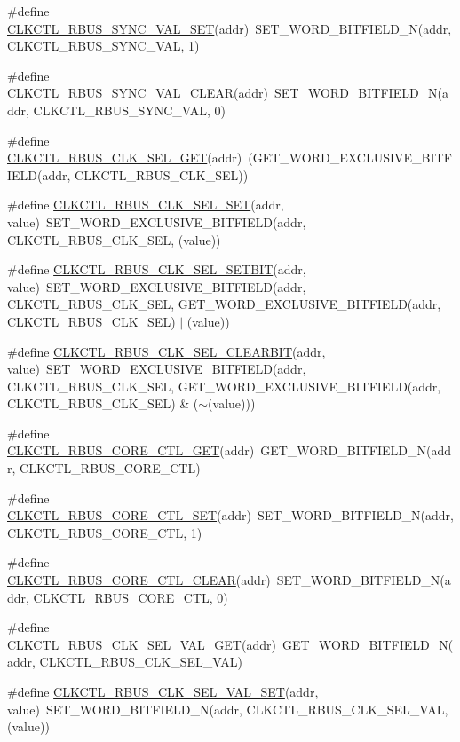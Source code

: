 \begin{DoxyCompactItemize}
\item 
\#define \hyperlink{a00544_a17efc520c0546b9386b4db06a1058df6}{CLKCTL\_\-RBUS\_\-SYNC\_\-VAL\_\-SET}(addr)~SET\_\-WORD\_\-BITFIELD\_\-N(addr, CLKCTL\_\-RBUS\_\-SYNC\_\-VAL, 1)
\item 
\#define \hyperlink{a00544_a7f05733a1dfb6b3bbe63cd0a077f350e}{CLKCTL\_\-RBUS\_\-SYNC\_\-VAL\_\-CLEAR}(addr)~SET\_\-WORD\_\-BITFIELD\_\-N(addr, CLKCTL\_\-RBUS\_\-SYNC\_\-VAL, 0)
\item 
\#define \hyperlink{a00544_a974dfbf293d8e8d42fe3201eb2436dcb}{CLKCTL\_\-RBUS\_\-CLK\_\-SEL\_\-GET}(addr)~(GET\_\-WORD\_\-EXCLUSIVE\_\-BITFIELD(addr, CLKCTL\_\-RBUS\_\-CLK\_\-SEL))
\item 
\#define \hyperlink{a00544_a8057bbf7c24e1f18e0985072b8407062}{CLKCTL\_\-RBUS\_\-CLK\_\-SEL\_\-SET}(addr, value)~SET\_\-WORD\_\-EXCLUSIVE\_\-BITFIELD(addr, CLKCTL\_\-RBUS\_\-CLK\_\-SEL, (value))
\item 
\#define \hyperlink{a00544_ad42d3759b0f858a3a7c19691ba63cb42}{CLKCTL\_\-RBUS\_\-CLK\_\-SEL\_\-SETBIT}(addr, value)~SET\_\-WORD\_\-EXCLUSIVE\_\-BITFIELD(addr, CLKCTL\_\-RBUS\_\-CLK\_\-SEL, GET\_\-WORD\_\-EXCLUSIVE\_\-BITFIELD(addr, CLKCTL\_\-RBUS\_\-CLK\_\-SEL) $|$ (value))
\item 
\#define \hyperlink{a00544_a1af6c5aaa7b540608b51a6ddfc6cdc49}{CLKCTL\_\-RBUS\_\-CLK\_\-SEL\_\-CLEARBIT}(addr, value)~SET\_\-WORD\_\-EXCLUSIVE\_\-BITFIELD(addr, CLKCTL\_\-RBUS\_\-CLK\_\-SEL, GET\_\-WORD\_\-EXCLUSIVE\_\-BITFIELD(addr, CLKCTL\_\-RBUS\_\-CLK\_\-SEL) \& ($\sim$(value)))
\item 
\#define \hyperlink{a00544_a98a623997dd801d154084fa052938a65}{CLKCTL\_\-RBUS\_\-CORE\_\-CTL\_\-GET}(addr)~GET\_\-WORD\_\-BITFIELD\_\-N(addr, CLKCTL\_\-RBUS\_\-CORE\_\-CTL)
\item 
\#define \hyperlink{a00544_a8de0a710729fd380b560f853e04b04ad}{CLKCTL\_\-RBUS\_\-CORE\_\-CTL\_\-SET}(addr)~SET\_\-WORD\_\-BITFIELD\_\-N(addr, CLKCTL\_\-RBUS\_\-CORE\_\-CTL, 1)
\item 
\#define \hyperlink{a00544_a1e9c911fda5cd465fb27a895ddc213af}{CLKCTL\_\-RBUS\_\-CORE\_\-CTL\_\-CLEAR}(addr)~SET\_\-WORD\_\-BITFIELD\_\-N(addr, CLKCTL\_\-RBUS\_\-CORE\_\-CTL, 0)
\item 
\#define \hyperlink{a00544_a8df85912464df9b98f250885585c6750}{CLKCTL\_\-RBUS\_\-CLK\_\-SEL\_\-VAL\_\-GET}(addr)~GET\_\-WORD\_\-BITFIELD\_\-N(addr, CLKCTL\_\-RBUS\_\-CLK\_\-SEL\_\-VAL)
\item 
\#define \hyperlink{a00544_a49659da24a25134b6cf2f93226e44166}{CLKCTL\_\-RBUS\_\-CLK\_\-SEL\_\-VAL\_\-SET}(addr, value)~SET\_\-WORD\_\-BITFIELD\_\-N(addr, CLKCTL\_\-RBUS\_\-CLK\_\-SEL\_\-VAL, (value))

\end{DoxyCompactItemize}
